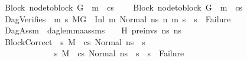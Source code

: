 \begin{isabellebody}
\ \ \ Block{\isacharcolon}{\kern0pt}\ {\isachardoublequoteopen}node{\isacharunderscore}{\kern0pt}to{\isacharunderscore}{\kern0pt}block\ G{}\ {\isacharbang}{\kern0pt}\ m{}\ {\isacharequal}{\kern0pt}\ cs{}{\isachardoublequoteclose}\ \isanewline
\ \ \ Block{}{\isacharcolon}{\kern0pt}\ {\isachardoublequoteopen}node{\isacharunderscore}{\kern0pt}to{\isacharunderscore}{\kern0pt}block\ G{}\ {\isacharbang}{\kern0pt}\ m{}\ {\isacharequal}{\kern0pt}\ cs{}{\isachardoublequoteclose}\ \ \isanewline
\ \ \ DagVerifies{\isacharcolon}{\kern0pt}\ {\isachardoublequoteopen}{\isasymAnd}\ m{}{\isacharprime}{\kern0pt}\ s{}{\isacharprime}{\kern0pt}{\isachardot}{\kern0pt}\ {\isacharparenleft}{\kern0pt}M{\isacharcomma}{\kern0pt}{\isasymLambda}{\isacharcomma}{\kern0pt}{\isasymGamma}{\isacharcomma}{\kern0pt}{\isasymOmega}{\isacharcomma}{\kern0pt}G{}\ {\isasymturnstile}\ {\isacharparenleft}{\kern0pt}Inl\ m{}{\isacharcomma}{\kern0pt}\ Normal\ ns{}{\isacharparenright}{\kern0pt}\ {\isacharminus}{\kern0pt}n{\isasymrightarrow}{\isacharasterisk}{\kern0pt}\ {\isacharparenleft}{\kern0pt}m{}{\isacharprime}{\kern0pt}{\isacharcomma}{\kern0pt}\ s{}{\isacharprime}{\kern0pt}{\isacharparenright}{\kern0pt}{\isacharparenright}{\kern0pt}\ {\isasymLongrightarrow}\ s{}{\isacharprime}{\kern0pt}\ {\isasymnoteq}\ Failure{\isachardoublequoteclose}\ \isanewline
\ \ \ DagAssm{\isacharcolon}{\kern0pt}\ \ {\isachardoublequoteopen}dag{\isacharunderscore}{\kern0pt}lemma{\isacharunderscore}{\kern0pt}assms\ {\isasymLambda}\ {\isasymGamma}\ {\isasymOmega}\ H\ pre{\isacharunderscore}{\kern0pt}invs\ ns{}\ ns{}{\isachardoublequoteclose}\ \isanewline
\ \ \ BlockCorrect{\isacharcolon}{\kern0pt}\ {\isachardoublequoteopen}{\isasymAnd}\ s{}{\isacharprime}{\kern0pt}{\isacharprime}{\kern0pt}{\isachardot}{\kern0pt}\ M{\isacharcomma}{\kern0pt}{\isasymLambda}{\isacharcomma}{\kern0pt}{\isasymGamma}{\isacharcomma}{\kern0pt}{\isasymOmega}\ {\isasymturnstile}\ {\isasymlangle}cs{}{\isacharcomma}{\kern0pt}\ Normal\ ns{}{\isasymrangle}\ {\isacharbrackleft}{\kern0pt}{\isasymrightarrow}{\isacharbrackright}{\kern0pt}\ s{}{\isacharprime}{\kern0pt}{\isacharprime}{\kern0pt}\ {\isasymLongrightarrow}\isanewline
\ \ \ \ \ \ \ \ \ \ \ \ \ \ \ {\isacharparenleft}{\kern0pt}{\isasymAnd}s{}{\isacharprime}{\kern0pt}{\isachardot}{\kern0pt}\ {\isacharparenleft}{\kern0pt}M{\isacharcomma}{\kern0pt}{\isasymLambda}{\isacharcomma}{\kern0pt}{\isasymGamma}{\isacharcomma}{\kern0pt}{\isasymOmega}\ {\isasymturnstile}\ {\isasymlangle}cs{}{\isacharcomma}{\kern0pt}\ Normal\ ns{}{\isasymrangle}\ {\isacharbrackleft}{\kern0pt}{\isasymrightarrow}{\isacharbrackright}{\kern0pt}\ s{}{\isacharprime}{\kern0pt}{\isacharparenright}{\kern0pt}\ {\isasymLongrightarrow}\ s{}{\isacharprime}{\kern0pt}\ {\isasymnoteq}\ Failure{\isacharparenright}{\kern0pt}\ {\isasymLongrightarrow}\isanewline

\end{isabellebody}
